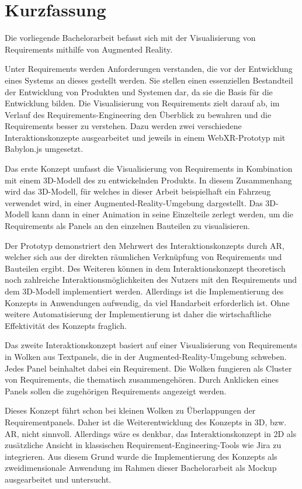 \chapter{Kurzfassung}

Die vorliegende Bachelorarbeit befasst sich mit der Visualisierung von Requirements mithilfe von Augmented Reality.

Unter Requirements werden Anforderungen verstanden, die vor der Entwicklung eines Systems an dieses gestellt werden.
Sie stellen einen essenziellen Bestandteil der Entwicklung von Produkten und Systemen dar, da sie die Basis für die Entwicklung bilden.
Die Visualisierung von Requirements zielt darauf ab, im Verlauf des Requirements-Engineering den Überblick zu bewahren und die Requirements besser zu verstehen.
Dazu werden zwei verschiedene Interaktionskonzepte ausgearbeitet und jeweils in einem WebXR-Prototyp mit Babylon.js umgesetzt.

Das erste Konzept umfasst die Visualisierung von Requirements in Kombination mit einem 3D-Modell des zu entwickelnden Produkts.
In diesem Zusammenhang wird das 3D-Modell, für welches in dieser Arbeit beispielhaft ein Fahrzeug verwendet wird, in einer Augmented-Reality-Umgebung dargestellt.
Das 3D-Modell kann dann in einer Animation in seine Einzelteile zerlegt werden, um die Requirements als Panels an den einzelnen Bauteilen zu visualisieren. 

Der Prototyp demonstriert den Mehrwert des Interaktionskonzepts durch AR, welcher sich aus der direkten räumlichen Verknüpfung von Requirements und Bauteilen ergibt.
Des Weiteren können in dem Interaktionskonzept theoretisch noch zahlreiche Interaktionsmöglichkeiten des Nutzers mit den Requirements und dem 3D-Modell implementiert werden.
Allerdings ist die Implementierung des Konzepts in Anwendungen aufwendig, da viel Handarbeit erforderlich ist.
Ohne weitere Automatisierung der Implementierung ist daher die wirtschaftliche Effektivität des Konzepts fraglich.

Das zweite Interaktionskonzept basiert auf einer Visualisierung von Requirements in Wolken aus Textpanels, die in der Augmented-Reality-Umgebung schweben.
Jedes Panel beinhaltet dabei ein Requirement.
Die Wolken fungieren als Cluster von Requirements, die thematisch zusammengehören.
Durch Anklicken eines Panels sollen die zugehörigen Requirements angezeigt werden.

Dieses Konzept führt schon bei kleinen Wolken zu Überlappungen der Requirementpanels.
Daher ist die Weiterentwicklung des Konzepts in 3D, bzw. AR, nicht sinnvoll.
Allerdings wäre es denkbar, das Interaktionskonzept in 2D als zusätzliche Ansicht in klassischen Requirement-Engineering-Tools wie Jira zu integrieren.
Aus diesem Grund wurde die Implementierung des Konzepts als zweidimensionale Anwendung im Rahmen dieser Bachelorarbeit als Mockup ausgearbeitet und untersucht.

